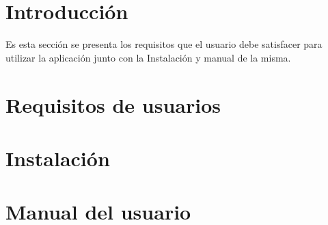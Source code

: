 
\section{Introducción}

Es esta sección se presenta los requisitos que el usuario debe satisfacer para
utilizar la aplicación junto con la Instalación y manual de la misma.

\section{Requisitos de usuarios}

\section{Instalación}

\section{Manual del usuario}


